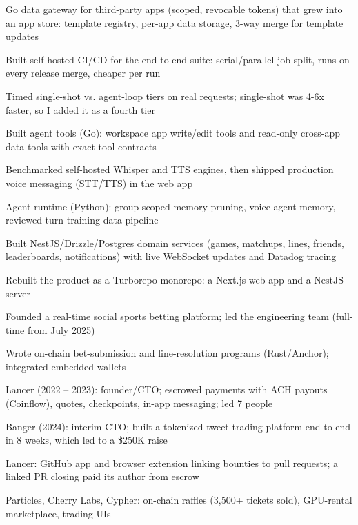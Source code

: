 \documentclass[print]{jack-resume}
\begin{document}
\begin{tightemize}
    \item Go data gateway for third-party apps (scoped, revocable tokens) that grew into an app store: template registry, per-app data storage, 3-way merge for template updates
    \item Built self-hosted CI/CD for the end-to-end suite: serial/parallel job split, runs on every release merge, cheaper per run
    \item Timed single-shot vs. agent-loop tiers on real requests; single-shot was 4-6x faster, so I added it as a fourth tier
    \item Built agent tools (Go): workspace app write/edit tools and read-only cross-app data tools with exact tool contracts
    \item Benchmarked self-hosted Whisper and TTS engines, then shipped production voice messaging (STT/TTS) in the web app
    \item Agent runtime (Python): group-scoped memory pruning, voice-agent memory, reviewed-turn training-data pipeline
\end{tightemize}
\sectionsep

\begin{tightemize}
    \item Built NestJS/Drizzle/Postgres domain services (games, matchups, lines, friends, leaderboards, notifications) with live WebSocket updates and Datadog tracing
    \item Rebuilt the product as a Turborepo monorepo: a Next.js web app and a NestJS server
    \item Founded a real-time social sports betting platform; led the engineering team (full-time from July 2025)
    \item Wrote on-chain bet-submission and line-resolution programs (Rust/Anchor); integrated embedded wallets
\end{tightemize}
\sectionsep

\begin{tightemize}
    \item Lancer (2022 -- 2023): founder/CTO; escrowed payments with ACH payouts (Coinflow), quotes, checkpoints, in-app messaging; led 7 people
    \item Banger (2024): interim CTO; built a tokenized-tweet trading platform end to end in 8 weeks, which led to a \$250K raise
    \item Lancer: GitHub app and browser extension linking bounties to pull requests; a linked PR closing paid its author from escrow
    \item Particles, Cherry Labs, Cypher: on-chain raffles (3,500+ tickets sold), GPU-rental marketplace, trading UIs
\end{tightemize}
\sectionsep
\end{document}
